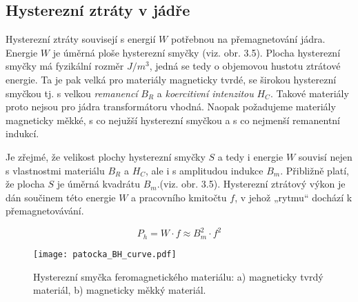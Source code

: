     \subsection{Hysterezní ztráty v jádře}
      Hysterezní ztráty souvisejí s energií $W$ potřebnou na přemagnetování jádra. Energie $W$ je úměrná 
      ploše hysterezní smyčky (viz. obr. 3.5). Plocha hysterezní smyčky má fyzikální rozměr $J/m^3$, jedná se 
      tedy o objemovou hustotu ztrátové energie. Ta je pak  velká pro materiály magneticky tvrdé, se širokou 
      hysterezní smyčkou tj. s velkou \emph{remanencí} $B_R$ a \emph{koercitivní intenzitou} $H_C$. Takové 
      materiály proto nejsou pro jádra transformátoru vhodná. Naopak požadujeme materiály magneticky měkké, s 
      co nejužší hysterezní smyčkou a s co nejmenší remanentní indukcí.

      Je zřejmé, že velikost plochy hysterezní smyčky $S$ a tedy i energie $W$ souvisí nejen s vlastnostmi 
      materiálu $B_R$ a $H_C$, ale i s amplitudou indukce $B_m$. Přibližně platí, že plocha $S$ je úměrná 
      kvadrátu $B_m$.(viz. obr. 3.5). Hysterezní ztrátový výkon je dán součinem této energie $W$ a pracovního 
      kmitočtu $f$, v jehož „rytmu“ dochází k přemagnetovávání.

      \begin{equation}\label{ES:eq_hyster_loss}
        P_h = W \cdot f \approx B_m^2 \cdot f^2
      \end{equation}

      \begin{figure}[ht!]
        \centering
        \texttt{[image: patocka\_BH\_curve.pdf]}
        \caption[Hysterezní smyčka feromagnetického materiálu]{Hysterezní smyčka feromagnetického
                 materiálu: \newline a) magneticky tvrdý materiál, \newline b) magneticky měkký
                 materiál.}
        \label{es:fig_BH_curve}
      \end{figure}

